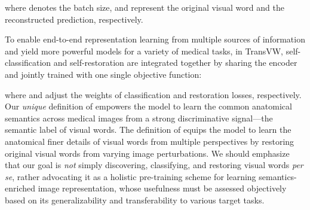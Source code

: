 \documentclass[journal,twoside,web]{ieeecolor}
\begin{document}
where  denotes the batch size,  and  represent the  original visual word and the reconstructed prediction, respectively.  

\bigskip
To enable end-to-end representation learning from multiple sources of information and yield more powerful models for a variety of medical tasks, in TransVW, self-classification and self-restoration are integrated together by sharing the encoder and jointly trained with one single objective function: 

where  and  adjust the weights of classification and restoration losses, respectively.
Our {\em unique} definition of   empowers the model  to learn the common anatomical semantics across medical images from a strong discriminative signal---the semantic label of visual words.
The definition of  equips the model to learn the anatomical finer details of visual words from multiple perspectives by restoring original visual words from varying image perturbations.
We should emphasize that our goal is {\em not} simply discovering, classifying, and restoring visual words \textit{per se}, rather advocating it as a holistic pre-training scheme for learning semantics-enriched image representation, whose usefulness must be assessed objectively based on its generalizability and transferability to various target tasks.
\end{document}
